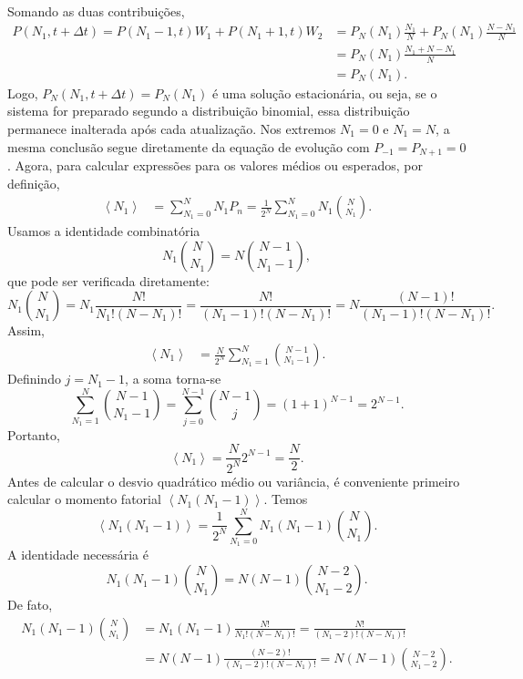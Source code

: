 \documentclass[12pt,a4paper]{article}
\newcommand{\avg}[1]{\left\langle #1\right\rangle}
\begin{document}
%
Somando as duas contribuições,
%
\begin{align}
  P(N_1, t + \Delta t) = P(N_1-1,t)W_1+P(N_1+1, t)W_2
  &=P_N(N_1)\frac{N_1}{N}+P_N(N_1)\frac{N-N_1}{N}\nonumber\\
  &=P_N(N_1)\frac{N_1+N-N_1}{N}\nonumber\\
  &=P_N(N_1).
\end{align}
%
Logo, $P_N(N_1, t + \Delta t)=P_N(N_1)$ é uma solução estacionária, ou seja, se o sistema for preparado segundo a distribuição binomial, essa distribuição permanece inalterada após cada atualização. Nos extremos $N_1=0$ e $N_1=N$, a mesma conclusão segue diretamente da equação de evolução com $P_{-1}=P_{N+1}=0$.
%
Agora, para calcular expressões para os valores médios ou esperados, por definição,
%
\begin{align}
  \avg{N_1}
  &=\sum_{N_1=0}^{N}N_1P_n
   =\frac{1}{2^N}\sum_{N_1=0}^{N}N_1\binom{N}{N_1}.
\end{align}
%
Usamos a identidade combinatória
%
\begin{equation}
  N_1\binom{N}{N_1}=N\binom{N-1}{N_1-1},
  \label{eq:combmean}
\end{equation}
%
que pode ser verificada diretamente:
\[
 N_1\binom{N}{N_1}=N_1\frac{N!}{N_1!(N-N_1)!}
 =\frac{N!}{(N_1-1)!(N-N_1)!}
 =N\frac{(N-1)!}{(N_1-1)!(N-N_1)!}.
\]
Assim,
%
\begin{align}
  \avg{N_1}
  &=\frac{N}{2^N}\sum_{N_1=1}^{N}\binom{N-1}{N_1-1}.
\end{align}
%
Definindo $j=N_1-1$, a soma torna-se
%
\begin{equation}
  \sum_{N_1=1}^{N}\binom{N-1}{N_1-1}
  =\sum_{j=0}^{N-1}\binom{N-1}{j}
  =(1+1)^{N-1}=2^{N-1}.
\end{equation}
%
Portanto,
%
\begin{equation}
  \boxed{\avg{N_1}=\frac{N}{2^N}2^{N-1}=\frac{N}{2}.}
  \label{eq:mean}
\end{equation}
%
Antes de calcular o desvio quadrático médio ou variância, é conveniente primeiro calcular o momento fatorial $\avg{N_1(N_1-1)}$. Temos
%
\begin{equation}
  \avg{N_1(N_1-1)}
  =\frac{1}{2^N}\sum_{N_1=0}^{N}N_1(N_1-1)\binom{N}{N_1}.
\end{equation}
%
A identidade necessária é
%
\begin{equation}
  N_1(N_1-1)\binom{N}{N_1}=N(N-1)\binom{N-2}{N_1-2}.
  \label{eq:combsecond}
\end{equation}
%
De fato,
%
\begin{align*}
  N_1(N_1-1)\binom{N}{N_1}
  &=N_1(N_1-1)\frac{N!}{N_1!(N-N_1)!}
   =\frac{N!}{(N_1-2)!(N-N_1)!}\\
  &=N(N-1)\frac{(N-2)!}{(N_1-2)!(N-N_1)!}
   =N(N-1)\binom{N-2}{N_1-2}.
\end{align*}
\end{document}
